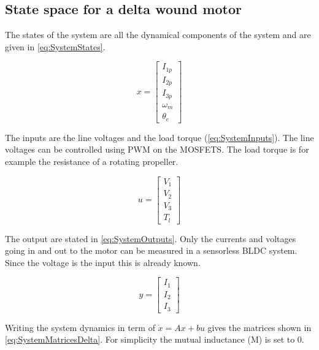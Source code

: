 \documentclass[]{report}
\begin{document}
\subsection*{State space for a delta wound motor}
The states of the system are all the dynamical components of the system and are given in \autoref{eq:SystemStates}.

\begin{equation}\label{eq:SystemStates}
	x = \begin{bmatrix} I_{1p} \\ I_{2p} \\ I_{3p} \\ \omega_m \\ \theta_e \end{bmatrix}
\end{equation}

The inputs are the line voltages and the load torque (\autoref{eq:SystemInputs}). The line voltages can be controlled using PWM on the MOSFETS. The load torque is for example the resistance of a rotating propeller.

\begin{equation}\label{eq:SystemInputs}
	u = \begin{bmatrix} V_{1} \\ V_{2} \\ V_{3} \\ T_l \end{bmatrix}
\end{equation}

The output are stated in \autoref{eq:SystemOutputs}. Only the currents and voltages going in and out to the motor can be measured in a sensorless BLDC system. Since the voltage is the input this is already known.

\begin{equation}\label{eq:SystemOutputs}
	y = \begin{bmatrix} I_{1} \\ I_{2} \\ I_{3} \end{bmatrix}
\end{equation}

Writing the system dynamics in term of $\dot{x} = Ax + bu$ gives the matrices shown in \autoref{eq:SystemMatricesDelta}. For simplicity the mutual inductance (M) is set to 0.
\end{document}
